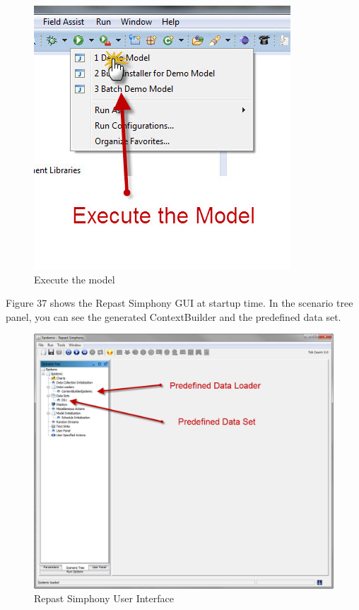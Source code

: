 \documentclass[11pt]{amsart}
\begin{document}
\begin{figure}[ht]
\begin{center}
\vspace{.2in}
\centerline {
\includegraphics[totalheight=0.3\textheight]{images/034.jpg}
}
\caption{Execute the model}
\label{fig:034}
\end{center}
\end{figure}


Figure 37 shows the Repast Simphony GUI at startup time. In the scenario tree panel, you can see the generated ContextBuilder and the predefined data set. 

\begin{figure}[ht]
\begin{center}
\vspace{.2in}
\centerline {
\includegraphics[totalheight=0.3\textheight]{images/035.jpg}
}
\caption{Repast Simphony User Interface}
\label{fig:035}
\end{center}
\end{figure}
\end{document}
